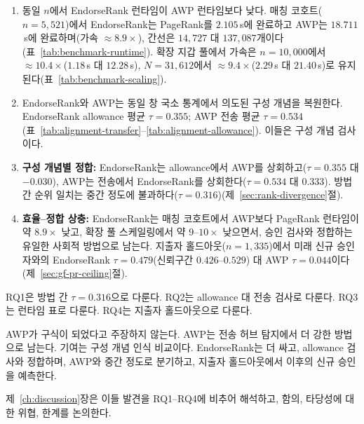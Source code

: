 \begin{enumerate}
\item[\textbf{C1.}] 동일 $n$에서 EndorseRank 런타임이 AWP 런타임보다 낮다. 매칭 코호트($n=5{,}521$)에서 EndorseRank는 PageRank를 $2.105$\,s에 완료하고 AWP는 $18.711$\,s에 완료하며(가속 $\approx 8.9\times$), 간선은 $14{,}727$ 대 $137{,}087$개이다(표~\ref{tab:benchmark-runtime}). 확장 지갑 풀에서 가속은 $n=10{,}000$에서 $\approx 10.4\times$($1.18$\,s 대 $12.28$\,s), $N=31{,}612$에서 $\approx 9.4\times$($2.29$\,s 대 $21.40$\,s)로 유지된다(표~\ref{tab:benchmark-scaling}).

\item[\textbf{C2.}] EndorseRank와 AWP는 동일 창 국소 통계에서 의도된 구성 개념을 복원한다. EndorseRank allowance 평균 $\tau=0.355$; AWP 전송 평균 $\tau=0.534$(표~\ref{tab:alignment-transfer}--\ref{tab:alignment-allowance}). 이들은 구성 개념 검사이다.

\item[\textbf{C3.}] \textbf{구성 개념별 정합:} EndorseRank는 allowance에서 AWP를 상회하고($\tau=0.355$ 대 $-0.030$), AWP는 전송에서 EndorseRank를 상회한다($\tau=0.534$ 대 $0.333$). 방법 간 순위 일치는 중간 정도에 불과하다($\tau=0.316$)(제~\ref{sec:rank-divergence}절).

\item[\textbf{C4.}] \textbf{효율--정합 상충:} EndorseRank는 매칭 코호트에서 AWP보다 PageRank 런타임이 약 $8.9\times$ 낮고, 확장 풀 스케일링에서 약 $9$--$10\times$ 낮으면서, 승인 검사와 정합하는 유일한 사회적 방법으로 남는다. 지출자 홀드아웃($n=1{,}335$)에서 미래 신규 승인자와의 EndorseRank $\tau=0.479$(신뢰구간 $0.426$--$0.529$) 대 AWP $\tau=0.044$이다(제~\ref{sec:gf-pr-ceiling}절).
\end{enumerate}

RQ1은 방법 간 $\tau=0.316$으로 다룬다. RQ2는 allowance 대 전송 검사로 다룬다. RQ3는 런타임 표로 다룬다. RQ4는 지출자 홀드아웃으로 다룬다.

AWP가 구식이 되었다고 주장하지 않는다. AWP는 전송 허브 탐지에서 더 강한 방법으로 남는다. 기여는 구성 개념 인식 비교이다. EndorseRank는 더 싸고, allowance 검사와 정합하며, AWP와 중간 정도로 분기하고, 지출자 홀드아웃에서 이후의 신규 승인을 예측한다.

제~\ref{ch:discussion}장은 이들 발견을 RQ1--RQ4에 비추어 해석하고, 함의, 타당성에 대한 위협, 한계를 논의한다.

